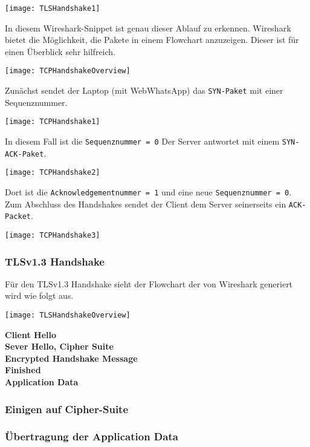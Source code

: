\begin{center}
    \texttt{[image: TLSHandshake1]}
\end{center}
In diesem Wireshark-Snippet ist genau dieser Ablauf zu erkennen.
Wireshark bietet die Möglichkeit, die Pakete in einem Flowchart anzuzeigen. 
Dieser ist für einen Überblick sehr hilfreich.
\begin{center}
    \texttt{[image: TCPHandshakeOverview]} 
\end{center}

Zunächst sendet der Laptop (mit WebWhatsApp) das \texttt{SYN-Paket} mit einer Sequenznummer.

\begin{center}
    \texttt{[image: TCPHandshake1]}
\end{center}

In diesem Fall ist die \texttt{Sequenznummer = 0}
Der Server antwortet mit einem \texttt{SYN-ACK-Paket}.

\begin{center}
    \texttt{[image: TCPHandshake2]}
\end{center}

Dort ist die \texttt{Acknowledgementnummer = 1} und eine neue \texttt{Sequenznummer = 0}. 
Zum Abschluss des Handshakes sendet der Client dem Server seinerseits ein \texttt{ACK-Packet}.

\begin{center}
    \texttt{[image: TCPHandshake3]}
\end{center}

\subsubsection{TLSv1.3 Handshake}
Für den TLSv1.3 Handshake sieht der Flowchart der von Wireshark generiert
wird wie folgt aus.

\begin{center}
    \texttt{[image: TLSHandshakeOverview]}
\end{center}

\textbf{Client Hello}\\

\textbf{Sever Hello, Cipher Suite}\\

\textbf{Encrypted Handshake Message}\\

\textbf{Finished}\\

\textbf{Application Data}\\

\subsubsection{Einigen auf Cipher-Suite}
\subsubsection{Übertragung der Application Data}